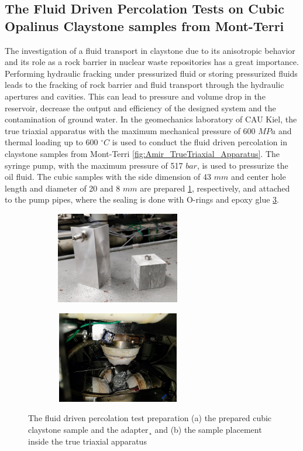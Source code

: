 \subsection {The Fluid Driven Percolation Tests on Cubic Opalinus Claystone samples from Mont-Terri}
\label{sec:Percolation_Claystone_Exp}
The investigation of a fluid transport in claystone due to its anisotropic behavior and its role as a rock barrier in nuclear waste repositories has a great importance. Performing hydraulic fracking under pressurized fluid or storing pressurized fluids leads to the fracking of rock barrier and fluid transport through the hydraulic apertures and cavities. This can lead to pressure and volume drop in the reservoir, decrease the output and efficiency of the designed system and the contamination of ground water. In the geomechanics laboratory of CAU Kiel, the true triaxial apparatus with the maximum mechanical pressure of 600 $MPa$ and thermal loading up to 600 $^{\circ}C$ is used to conduct the fluid driven percolation in claystone samples from Mont-Terri \ref{fig:Amir_TrueTriaxial_Apparatus}. The syringe pump, with the maximum pressure of 517 $bar$, is used to pressurize the oil fluid. The cubic samples with the side dimension of 43 $mm$ and center hole length and diameter of 20 and 8 $mm$ are prepared \ref{fig:Amir_Percolation_Adapter}, respectively, and attached to the pump pipes, where the sealing is done with O-rings and epoxy glue \ref{fig:Amir_Percolation_Setup}. 


\begin{figure}[!ht]
\begin{subfigure}[c]{0.48\textwidth}
\includegraphics[width=6cm,height=4cm]{figures/Amir_Percolation_Adapter.png}
\subcaption{}
\label{fig:Amir_Percolation_Adapter}
\end{subfigure}
\hfill
\begin{subfigure}[c]{0.48\textwidth}
\includegraphics[width=6cm,height=4cm]{figures/Amir_Percolation_Setup.png}
\subcaption{}
\label{fig:Amir_Percolation_Setup}
\end{subfigure}
\caption{The fluid driven percolation test preparation (a) the prepared cubic claystone sample and the adapter¸ and (b) the sample placement inside the true triaxial apparatus}
\end{figure}


